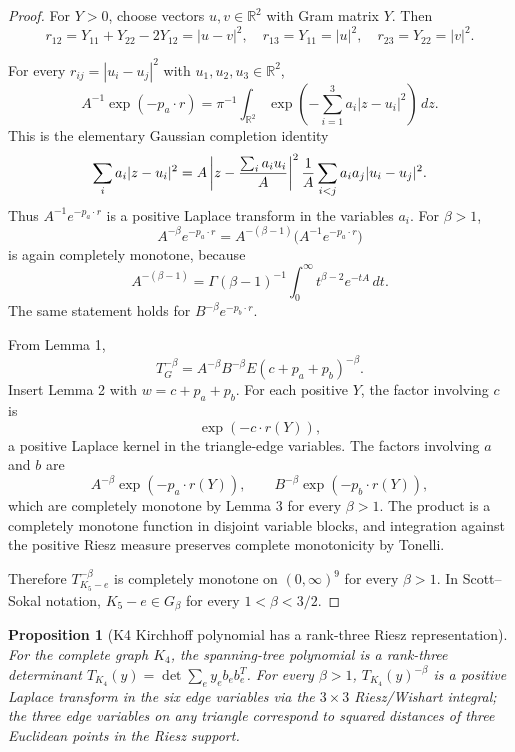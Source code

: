 \documentclass[11pt]{article}
\numberwithin{equation}{section}
\newtheorem{proposition}[theorem]{Proposition}
\theoremstyle{definition}
\theoremstyle{remark}
\newcommand{\1}{\mathbf 1}
\begin{document}
\begin{proof}
For \(Y>0\), choose vectors \(u,v\in\mathbb R^2\) with Gram matrix \(Y\). Then
\[
r_{12}=Y_{11}+Y_{22}-2Y_{12}=|u-v|^2,\quad
r_{13}=Y_{11}=|u|^2,\quad
r_{23}=Y_{22}=|v|^2 .
\]

For every \(r_{ij}=|u_i-u_j|^2\) with \(u_1,u_2,u_3\in\mathbb R^2\),
\[
A^{-1}\exp(-p_a\cdot r)
=\pi^{-1}\int_{\mathbb R^2}
\exp\left(-\sum_{i=1}^3 a_i|z-u_i|^2\right)\,dz.
\]
This is the elementary Gaussian completion identity
\[
\sum_i a_i|z-u_i|^2
=A\left|z-\frac{\sum_i a_iu_i}{A}\right|^2
{1\over A}\sum_{i<j}a_ia_j|u_i-u_j|^2 .
\]
Thus \(A^{-1}e^{-p_a\cdot r}\) is a positive Laplace transform in the variables \(a_i\). For \(\beta>1\),
\[
A^{-\beta}e^{-p_a\cdot r}
=A^{-(\beta-1)}\big(A^{-1}e^{-p_a\cdot r}\big)
\]
is again completely monotone, because
\[
A^{-(\beta-1)}
=\Gamma(\beta-1)^{-1}\int_0^\infty t^{\beta-2}e^{-tA}\,dt.
\]
The same statement holds for \(B^{-\beta}e^{-p_b\cdot r}\).

From Lemma 1,
\[
T_G^{-\beta}=A^{-\beta}B^{-\beta}E(c+p_a+p_b)^{-\beta}.
\]
Insert Lemma 2 with \(w=c+p_a+p_b\). For each positive \(Y\), the factor involving \(c\) is
\[
\exp(-c\cdot r(Y)),
\]
a positive Laplace kernel in the triangle-edge variables. The factors involving \(a\) and \(b\) are
\[
A^{-\beta}\exp(-p_a\cdot r(Y)),
\qquad
B^{-\beta}\exp(-p_b\cdot r(Y)),
\]
which are completely monotone by Lemma 3 for every \(\beta>1\). The product is a completely monotone function in disjoint variable blocks, and integration against the positive Riesz measure preserves complete monotonicity by Tonelli.

Therefore \(T_{K_5-e}^{-\beta}\) is completely monotone on \((0,\infty)^9\) for every \(\beta>1\). In Scott--Sokal notation, \(K_5-e\in G_\beta\) for every \(1<\beta<3/2\).
\end{proof}

\begin{proposition}[K4 Kirchhoff polynomial has a rank-three Riesz representation]
\label{res:k4kirchhoff-rieszrank3-laplacerepresentation}
For the complete graph \(K_4\), the spanning-tree polynomial is a rank-three determinant \(T_{K_4}(y)=\det\sum_e y_e b_eb_e^T\). For every \(\beta>1\), \(T_{K_4}(y)^{-\beta}\) is a positive Laplace transform in the six edge variables via the \(3\times3\) Riesz/Wishart integral; the three edge variables on any triangle correspond to squared distances of three Euclidean points in the Riesz support.
\end{proposition}
\end{document}
